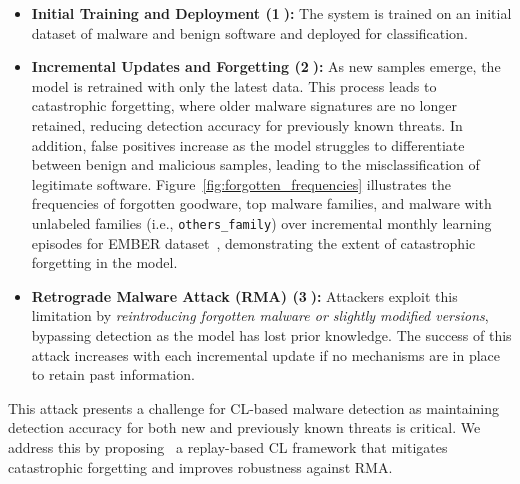 \begin{itemize}
    \item \textbf{Initial Training and Deployment ({\Large \textcircled{\normalsize 1}}):} 
    The system is trained on an initial dataset of malware and benign software and deployed for classification.


    \item \textbf{Incremental Updates and Forgetting ({\Large \textcircled{\normalsize 2}}):} 
    As new samples emerge, the model is retrained with only the latest data. This process leads to catastrophic forgetting, where older malware signatures are no longer retained, reducing detection accuracy for previously known threats. In addition, false positives increase as the model struggles to differentiate between benign and malicious samples, leading to the misclassification of legitimate software. Figure~\ref{fig:forgotten_frequencies} illustrates the frequencies of forgotten goodware, top malware families, and malware with unlabeled families (i.e., \texttt{others\_family}) over incremental monthly learning episodes for EMBER dataset~\cite{ember}, demonstrating the extent of catastrophic forgetting in the model.




    \item \textbf{Retrograde Malware Attack (RMA) ({\Large \textcircled{\normalsize 3}}):} 
    Attackers exploit this limitation by \textit{reintroducing forgotten malware or slightly modified versions}, bypassing detection as the model has lost prior knowledge. The success of this attack increases with each incremental update if no mechanisms are in place to retain past information.
\end{itemize}

This attack presents a challenge for CL-based malware detection as maintaining detection accuracy for both new and previously known threats is critical. We address this by proposing \system~a replay-based CL framework that mitigates catastrophic forgetting and improves robustness against RMA.







